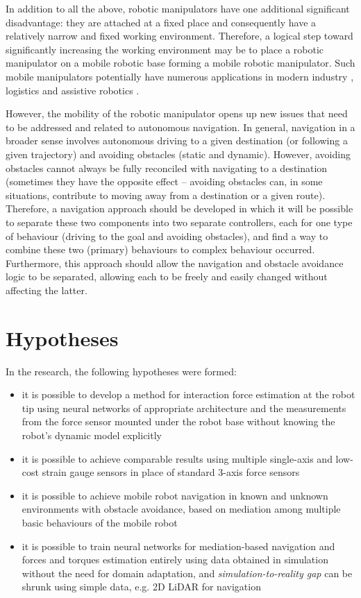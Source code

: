 In addition to all the above, robotic manipulators have one additional significant disadvantage: they are attached at a fixed place and consequently have a relatively narrow and fixed working environment. Therefore, a logical step toward significantly increasing the working environment may be to place a robotic manipulator on a mobile robotic base forming a mobile robotic manipulator. Such mobile manipulators potentially have numerous applications in modern industry \cite{Madsen2015}, logistics \cite{Iriondo2019} and assistive robotics \cite{Park2020}.

However, the mobility of the robotic manipulator opens up new issues that need to be addressed and related to autonomous navigation. In general, navigation in a broader sense involves autonomous driving to a given destination (or following a given trajectory) and avoiding obstacles (static and dynamic). However, avoiding obstacles cannot always be fully reconciled with navigating to a destination (sometimes they have the opposite effect -- avoiding obstacles can, in some situations, contribute to moving away from a destination or a given route). Therefore, a navigation approach should be developed in which it will be possible to separate these two components into two separate controllers, each for one type of behaviour (driving to the goal and avoiding obstacles), and find a way to combine these two (primary) behaviours to complex behaviour occurred. Furthermore, this approach should allow the navigation and obstacle avoidance logic to be separated, allowing each to be freely and easily changed without affecting the latter.

\section{Hypotheses}

In the research, the following hypotheses were formed:

\begin{itemize}
    \item it is possible to develop a method for interaction force estimation at the robot tip using neural networks of appropriate architecture and the measurements from the force sensor mounted under the robot base without knowing the robot's dynamic model explicitly
    \item it is possible to achieve comparable results using multiple single-axis and low-cost strain gauge sensors in place of standard 3-axis force sensors
    \item it is possible to achieve mobile robot navigation in known and unknown environments with obstacle avoidance, based on mediation among multiple basic behaviours of the mobile robot
    \item it is possible to train neural networks for mediation-based navigation and forces and torques estimation entirely using data obtained in simulation without the need for domain adaptation, and \emph{simulation-to-reality gap} can be shrunk using simple data, e.g. 2D LiDAR for navigation
\end{itemize}

